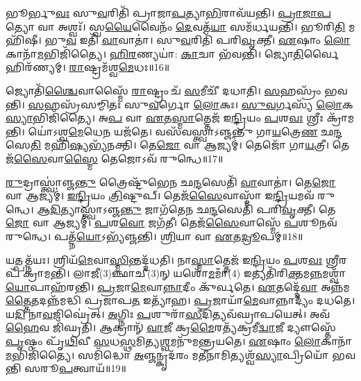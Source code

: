 𑌭𑍂𑌰𑍍𑌭𑍁\-\ul{𑌵𑌃} 𑌸𑍁\-\ul{𑌵}\-𑌰𑌿𑌤𑌿᳴ 𑌪𑍍𑌰𑌾𑌜𑌾\-\ul{𑌪}\-𑌤𑍍𑌯𑌾\-\ul{𑌭𑌿}\-𑌰𑌾𑌵᳴𑌯𑌨𑍍𑌤𑌿।
\-\ul{𑌪𑍍𑌰𑌾}\-\-\ul{𑌜𑌾}\-\-\ul{𑌪}\-𑌤𑍍𑌯𑍋 𑌵𑌾 𑌅𑌶𑍍𑌵𑌃᳴।
𑌸𑍍𑌵\-\ul{𑌯𑍈}\-𑌵𑍈𑌨𑌂᳴ \ul{𑌦𑍇}\-𑌵𑌤᳴\-\ul{𑌯𑌾} 𑌸𑌮᳴𑌰𑍍𑌧𑌯𑌨𑍍𑌤𑌿।
𑌭𑍂𑌰𑌿\-\ul{𑌤𑌿} 𑌮𑌹𑌿᳴𑌷𑍀।
𑌭𑍁\-\ul{𑌵} 𑌇𑌤𑌿᳴ \ul{𑌵𑌾}\-𑌵𑌾𑌤𑌾॑।
𑌸𑍁\-\ul{𑌵}\-𑌰𑌿𑌤𑌿᳴ 𑌪𑌰𑌿\-\ul{𑌵𑍃}\-𑌕𑍍𑌤𑍀।
\-\ul{𑌏}\-𑌷𑌾𑌂 \ul{𑌲𑍋}\-𑌕𑌾𑌨𑌾᳴\-\ul{𑌮}\-𑌭𑌿𑌜𑌿᳴𑌤𑍍𑌯𑍈।
\-\ul{𑌹𑌿}\-\-\ul{𑌰}\-𑌣𑍍𑌯𑌯𑌾॑: \ul{𑌕𑌾}\-𑌚𑌾 𑌭᳴𑌵𑌨𑍍𑌤𑌿।
𑌜𑍍𑌯𑍋\-\ul{𑌤𑌿}\-𑌰𑍍𑌵𑍈 𑌹𑌿𑌰᳴𑌣𑍍𑌯𑌮𑍍।
\-\ul{𑌰𑌾}\-𑌷𑍍𑌟𑍍𑌰𑌮᳴𑌶𑍍𑌵\-\ul{𑌮𑍇}\-𑌧𑌃॥16॥

𑌜𑍍𑌯𑍋𑌤𑌿᳴\-\ul{𑌶𑍍𑌚𑍈}\-𑌵𑌾𑌸𑍍𑌮𑍈᳴ \ul{𑌰𑌾}\-𑌷𑍍𑌟𑍍𑌰𑌂 𑌚᳴ \ul{𑌸}\-𑌮𑍀𑌚𑍀᳴ 𑌦𑌧𑌾𑌤𑌿।
\-\ul{𑌸}\-𑌹𑌸𑍍𑌰𑌂᳴ 𑌭𑌵𑌨𑍍𑌤𑌿।
\-\ul{𑌸}\-𑌹𑌸𑍍𑌰᳴𑌸𑌮𑍍𑌮𑌿𑌤𑌃 𑌸𑍁\-\ul{𑌵}\-𑌰𑍍𑌗𑍋 \ul{𑌲𑍋}\-𑌕𑌃।
\-\ul{𑌸𑍁}\-\-\ul{𑌵}\-𑌰𑍍𑌗𑌸𑍍𑌯᳴ \ul{𑌲𑍋}\-𑌕\-\ul{𑌸𑍍𑌯𑌾}\-𑌭𑌿𑌜𑌿᳴𑌤𑍍𑌯𑍈।
𑌅\-\ul{𑌪} 𑌵𑌾 \ul{𑌏}\-𑌤\-\ul{𑌸𑍍𑌮𑌾}\-𑌤𑍍𑌤𑍇𑌜᳴ 𑌇\-\ul{𑌨𑍍𑌦𑍍𑌰𑌿}\-𑌯𑌂 \ul{𑌪}\-𑌶\-\ul{𑌵𑌃} 𑌶𑍍𑌰𑍀𑌃 𑌕𑍍𑌰𑌾᳴𑌮𑌨𑍍𑌤𑌿।
𑌯𑍋॑𑌽𑌶𑍍𑌵\-\ul{𑌮𑍇}\-𑌧𑍇\-\ul{𑌨} 𑌯𑌜᳴𑌤𑍇।
𑌵𑌸᳴𑌵𑌸𑍍𑌤𑍍𑌵𑌾\-𑌽𑌞𑍍𑌜𑌨𑍍𑌤𑍁 𑌗𑌾\-\ul{𑌯}\-𑌤𑍍𑌰𑍇\-\ul{𑌣} 𑌛\-\ul{𑌨𑍍𑌦}\-𑌸𑍇\-\ul{𑌤𑌿} 𑌮𑌹𑌿᳴\-\ul{𑌷𑍍𑌯}\-𑌭𑍍𑌯᳴𑌨𑌕𑍍𑌤𑌿।
𑌤𑍇\-\ul{𑌜𑍋} 𑌵𑌾 𑌆𑌜𑍍𑌯𑌮𑍍॑।
𑌤𑍇𑌜𑍋᳴ 𑌗𑌾\-\ul{𑌯}\-𑌤𑍍𑌰𑍀।
𑌤𑍇𑌜᳴\-\ul{𑌸𑍈}\-𑌵𑌾\-\ul{𑌸𑍍𑌮𑍈} 𑌤𑍇𑌜𑍋\-𑌽𑌵᳴ 𑌰𑍁𑌨𑍍𑌧𑍇॥17॥

\-\ul{𑌰𑍁}\-𑌦𑍍𑌰𑌾𑌸𑍍𑌤𑍍𑌵𑌾॑𑌞𑍍𑌜\-\ul{𑌨𑍍𑌤𑍁} 𑌤𑍍𑌰𑍈𑌷𑍍𑌟𑍁᳴𑌭𑍇\-\ul{𑌨} 𑌛\-\ul{𑌨𑍍𑌦}\-𑌸𑍇𑌤𑌿᳴ \ul{𑌵𑌾}\-𑌵𑌾𑌤𑌾॑।
𑌤𑍇\-\ul{𑌜𑍋} 𑌵𑌾 𑌆𑌜𑍍𑌯𑌮𑍍॑।
\-\ul{𑌇}\-\-\ul{𑌨𑍍𑌦𑍍𑌰𑌿}\-𑌯𑌂 \ul{𑌤𑍍𑌰𑌿}\-𑌷𑍍𑌟𑍁𑌪𑍍।
𑌤𑍇𑌜᳴\-\ul{𑌸𑍈}\-𑌵𑌾𑌸𑍍𑌮𑌾᳴ 𑌇\-\ul{𑌨𑍍𑌦𑍍𑌰𑌿}\-𑌯𑌮𑌵᳴ 𑌰𑍁𑌨𑍍𑌧𑍇।
\-\ul{𑌆}\-\-\ul{𑌦𑌿}\-𑌤𑍍𑌯𑌾𑌸𑍍𑌤𑍍𑌵𑌾॑\-𑌽𑌞𑍍𑌜\-\ul{𑌨𑍍𑌤𑍁} 𑌜𑌾𑌗᳴𑌤𑍇\-\ul{𑌨} 𑌛\-\ul{𑌨𑍍𑌦}\-𑌸𑍇𑌤𑌿᳴ 𑌪𑌰𑌿\-\ul{𑌵𑍃}\-𑌕𑍍𑌤𑍀।
𑌤𑍇\-\ul{𑌜𑍋} 𑌵𑌾 𑌆𑌜𑍍𑌯𑌮𑍍॑।
\-\ul{𑌪}\-𑌶\-\ul{𑌵𑍋} 𑌜𑌗᳴𑌤𑍀।
𑌤𑍇𑌜᳴\-\ul{𑌸𑍈}\-𑌵𑌾𑌸𑍍𑌮𑍇᳴ \ul{𑌪}\-𑌶𑍂𑌨𑌵᳴ 𑌰𑍁𑌨𑍍𑌧𑍇।
𑌪𑌤𑍍𑌨᳴\-\ul{𑌯𑍋}\-\-𑌽𑌭𑍍𑌯᳴𑌞𑍍𑌜𑌨𑍍𑌤𑌿।
\-\ul{𑌶𑍍𑌰𑌿}\-𑌯𑌾 𑌵𑌾 \ul{𑌏}\-𑌤\-\ul{𑌦𑍍𑌰𑍂}\-𑌪𑌮𑍍॥18॥

𑌯𑌤𑍍𑌪𑌤𑍍𑌨᳴𑌯𑌃।
𑌶𑍍𑌰𑌿𑌯᳴\-\ul{𑌮𑍇}\-𑌵𑌾\-\ul{𑌸𑍍𑌮𑌿}\-𑌨𑍍𑌤𑌦𑍍𑌦᳴𑌧𑌤𑌿।
𑌨𑌾\-\ul{𑌸𑍍𑌮𑌾}\-𑌤𑍍𑌤𑍇𑌜᳴ 𑌇\-\ul{𑌨𑍍𑌦𑍍𑌰𑌿}\-𑌯𑌂 \ul{𑌪}\-𑌶\-\ul{𑌵𑌃} 𑌶𑍍𑌰𑍀𑌰𑌪᳴ 𑌕𑍍𑌰𑌾𑌮𑌨𑍍𑌤𑌿।
𑌲𑌾𑌜𑍀(3)𑌞𑍍𑌛𑌾𑌚𑍀(3)𑌨𑍍 𑌯𑌶𑍋᳴\-\ul{𑌮}\-𑌮𑌾𑌁(4) 𑌇𑌤𑍍𑌯𑌤𑌿᳴𑌰𑌿\-\ul{𑌕𑍍𑌤}\-𑌮\-\ul{𑌨𑍍𑌨}\-𑌮𑌶𑍍𑌵𑌾᳴\-\ul{𑌯𑍋}\-𑌪𑌾𑌹᳴𑌰𑌨𑍍𑌤𑌿।
\-\ul{𑌪𑍍𑌰}\-𑌜𑌾\-\ul{𑌮𑍇}\-𑌵𑌾\-\ul{𑌨𑍍𑌨𑌾}\-𑌦𑍀𑌂 𑌕𑍁᳴𑌰𑍍𑌵𑌤𑍇।
\-\ul{𑌏}\-𑌤𑌦𑍍𑌦𑍇᳴\-\ul{𑌵𑌾} 𑌅𑌨𑍍𑌨᳴𑌮\-\ul{𑌤𑍍𑌤𑍈}\-𑌤𑌦𑌨𑍍𑌨᳴𑌮𑌦𑍍𑌧𑌿 𑌪𑍍𑌰𑌜𑌾𑌪\-\ul{𑌤} 𑌇𑌤𑍍𑌯𑌾᳴𑌹।
\-\ul{𑌪𑍍𑌰}\-𑌜𑌾𑌯𑌾᳴\-\ul{𑌮𑍇}\-𑌵𑌾𑌨𑍍𑌨𑌾𑌦𑍍𑌯𑌂᳴ 𑌦𑌧𑌤𑍇।
𑌯\-\ul{𑌦𑌿} 𑌨𑌾\-\ul{𑌵}\-𑌜𑌿𑌘𑍍𑌰𑍇॑𑌤𑍍।
\-\ul{𑌅}\-𑌗𑍍𑌨𑌿𑌃 \ul{𑌪}\-𑌶𑍁𑌰𑌾᳴\-\ul{𑌸𑍀}\-𑌦𑌿𑌤𑍍𑌯𑌵᳴𑌘𑍍𑌰𑌾𑌪𑌯𑍇𑌤𑍍।
𑌅𑌵᳴ \ul{𑌹𑍈}\-𑌵 𑌜𑌿᳴𑌘𑍍𑌰𑌤𑌿।
𑌆𑌕𑍍𑌰𑌾𑌨𑍍᳴ \ul{𑌵𑌾}\-𑌜𑍀 𑌕𑍍𑌰\-\ul{𑌮𑍈}\-𑌰𑌤𑍍𑌯᳴𑌕𑍍𑌰𑌮𑍀\-\ul{𑌦𑍍𑌵𑌾}\-𑌜𑍀 𑌦𑍍𑌯𑍗𑌸𑍍𑌤𑍇᳴ \ul{𑌪𑍃}\-𑌷𑍍𑌠𑌂 𑌪𑍃᳴\-\ul{𑌥𑌿}\-𑌵𑍀 \ul{𑌸}\-𑌧\-\ul{𑌸𑍍𑌥}\-𑌮𑌿𑌤𑍍𑌯\-\ul{𑌶𑍍𑌵}\-𑌮𑌨𑍁᳴𑌮𑌨𑍍𑌤𑍍𑌰𑌯𑌤𑍇।
\-\ul{𑌏}\-𑌷𑌾𑌂 \ul{𑌲𑍋}\-𑌕𑌾𑌨𑌾᳴\-\ul{𑌮}\-𑌭𑌿𑌜𑌿᳴𑌤𑍍𑌯𑍈।
𑌸𑌮𑌿᳴𑌦𑍍𑌧𑍋 \ul{𑌅}\-𑌞𑍍𑌜𑌨𑍍𑌕𑍃𑌦᳴𑌰𑌂 𑌮\-\ul{𑌤𑍀}\-𑌨𑌾𑌮𑌿𑌤𑍍𑌯𑌶𑍍𑌵᳴\-\ul{𑌸𑍍𑌯𑌾}\-𑌪𑍍𑌰𑌿𑌯𑍋᳴ 𑌭𑌵𑌨𑍍𑌤𑌿 𑌸𑌰𑍂\-\ul{𑌪}\-𑌤𑍍𑌵𑌾𑌯᳴॥19॥\anuvakamend[𑌪𑌰𑌿᳴\-\ul{𑌤}\-𑌸𑍍𑌥𑍁\-\ul{𑌷} 𑌇𑌤𑍍𑌯𑌾᳴\-\ul{𑌹𑍇}\-𑌮𑍇 \ul{𑌏}\-𑌵𑌾𑌸𑍍𑌮𑍈᳴ 𑌯𑍁𑌨\-\ul{𑌕𑍍𑌤𑍍𑌯}\-𑌭𑌿𑌜𑌿᳴𑌤𑍍𑌯𑍈 𑌭𑌰𑌨𑍍𑌤𑍍𑌯𑌶𑍍𑌵\-\ul{𑌮𑍇}\-𑌧𑍋 𑌰𑍁᳴𑌨𑍍𑌧𑍇 \ul{𑌰𑍂}\-𑌪𑌞𑍍𑌜𑌿᳴𑌘𑍍𑌰\-\ul{𑌤𑌿} 𑌤𑍍𑌰𑍀𑌣𑌿᳴ 𑌚]

